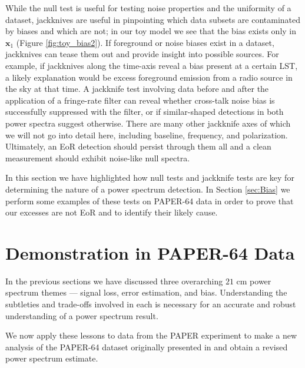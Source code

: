 \documentclass[preprint2,numberedappendix,tighten]{aastex6}  %
\begin{document}
While the null test is useful for testing noise properties and the uniformity of a dataset, jackknives are useful in pinpointing 
which data subsets are contaminated by biases and which are not; in our toy model we see that the bias exists only in $
\textbf{x}_{1}$ (Figure \ref{fig:toy_bias2}). If foreground or noise biases exist in a dataset, jackknives can tease them out and 
provide insight into possible sources. For example, if jackknives along the time-axis reveal a bias present at a certain LST, a 
likely explanation would be excess foreground emission from a radio source in the sky at that time. A jackknife test involving 
data before and after the application of a fringe-rate filter can reveal whether cross-talk noise bias is successfully suppressed 
with the filter, or if similar-shaped detections in both power spectra suggest otherwise. There are many other jackknife axes of 
which we will not go into detail here, including baseline, frequency, and polarization. Ultimately, an EoR detection should persist 
through them all and a clean measurement should exhibit noise-like null spectra.

In this section we have highlighted how null tests and jackknife tests are key for determining the nature of a power spectrum 
detection. In Section \ref{sec:Bias} we perform some examples of these tests on PAPER-64 data in order to prove that our 
excesses are not EoR and to identify their likely cause. 


\section{Demonstration in PAPER-64 Data}
\label{sec:CaseStudy}

In the previous sections we have discussed three overarching $21$ cm power spectrum themes --- signal loss, error estimation, 
and bias. Understanding the subtleties and trade-offs involved in each is necessary for an accurate and robust understanding of 
a power spectrum result. 

We now apply these lessons to data from the PAPER experiment to make a new analysis of the PAPER-64 dataset originally presented in 
 and obtain a revised power spectrum estimate.
\end{document}
